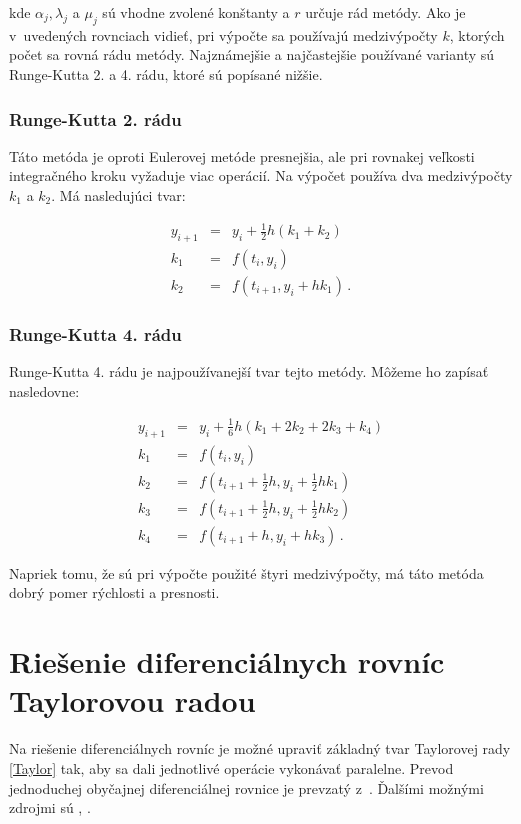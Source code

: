kde $\alpha_{j}, \lambda_{j}$ a $\mu_{j}$ sú vhodne zvolené konštanty a $ r $ určuje rád metódy. Ako je v~uvedených rovnciach vidieť, pri výpočte sa používajú medzivýpočty $ k $, ktorých počet sa rovná rádu metódy.
Najznámejšie a najčastejšie používané varianty sú Runge-Kutta 2. a 4. rádu, ktoré sú popísané nižšie.

\subsection{Runge-Kutta 2. rádu} \label{RK2}
Táto metóda je oproti Eulerovej metóde presnejšia, ale pri rovnakej veľkosti integračného kroku vyžaduje viac operácií. Na výpočet používa dva medzivýpočty $ k_{1} $ a $ k_{2} $. Má nasledujúci tvar:

\begin{eqnarray}
y_{i+1} & = & y_{i} + \frac{1}{2}h(k_{1} + k_{2}) \\
k_{1} & = & f(t_{i},y_{i}) \nonumber \\
k_{2} & = & f(t_{i+1}, y_{i} + hk_{1}) \, . \nonumber
\end{eqnarray}


\newpage
\subsection{Runge-Kutta 4. rádu} \label{RK4}
Runge-Kutta 4. rádu je najpoužívanejší tvar tejto metódy. Môžeme ho zapísať nasledovne:

\begin{eqnarray}
y_{i+1} & = & y_{i} + \frac{1}{6}h(k_{1} + 2k_{2} + 2k_{3} + k_{4}) \\
k_{1} & = & f(t_{i},y_{i}) \nonumber \\
k_{2} & = & f(t_{i+1} + \frac{1}{2}h, y_{i} + \frac{1}{2}hk_{1}) \nonumber \\
k_{3} & = & f(t_{i+1} + \frac{1}{2}h, y_{i} + \frac{1}{2}hk_{2}) \nonumber \\
k_{4} & = & f(t_{i+1} + h, y_{i} + hk_{3}) \, . \nonumber
\end{eqnarray}

Napriek tomu, že sú pri výpočte použité štyri medzivýpočty, má táto metóda dobrý pomer rýchlosti a presnosti.


\chapter{Riešenie diferenciálnych rovníc Taylorovou radou} \label{SOLUTION_WITH_TAYLOR}
Na riešenie diferenciálnych rovníc je možné upraviť základný tvar Taylorovej rady \eqref{Taylor} tak, aby sa dali jednotlivé operácie vykonávať paralelne. Prevod jednoduchej obyčajnej diferenciálnej rovnice je prevzatý z~\cite{MatecnyBP}. Ďalšími možnými zdrojmi sú \cite{OpalkaDP}, \cite{KrausDisP}. \\

